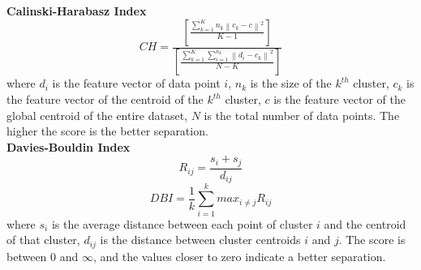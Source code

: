 \documentclass[journal,article,submit,pdftex,moreauthors]{Definitions/mdpi}
\begin{document}
\textbf{Calinski-Harabasz Index}
    \begin{equation}
        CH=\frac{\left[\frac{\sum_{k=1}^{K} n_{k}\left\|c_{k}-c\right\|^{2}}{K-1}\right]}{\left[\frac{\sum_{k=1}^{K} \sum_{i=1}^{n_{k}}\left\|d_{i}-c_{k}\right\|^{2}}{N-K}\right]}
    \end{equation}
    where $d_i$ is the feature vector of data point $i$, $n_k$ is the size of the $k^{th}$ cluster, $c_k$ is the feature vector of the centroid of the $k^{th}$ cluster, $c$ is the feature vector of the global centroid of the entire dataset, $N$ is the total number of data points. The higher the score is the better separation.\\

\textbf{Davies-Bouldin Index}
    \begin{equation}
        R_{ij} = \frac{s_{i} + s_{j}}{d_{ij}}
    \end{equation}
    \begin{equation}
        DBI = \frac{1}{k} \sum_{i=1}^{k} max_{i \neq j} R_{ij}
    \end{equation}
    where $s_{i}$ is the average distance between each point of cluster $i$ and the centroid of that cluster, $d_{ij}$ is the distance between cluster centroids $i$ and $j$. The score is between $0$ and $\infty$, and the values closer to zero indicate a better separation.\\



\end{document}
